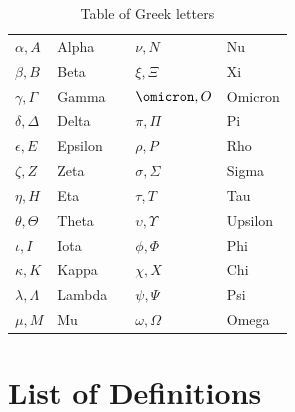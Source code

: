 \documentclass[openany,leqno,11pt,draft]{book}
\theoremstyle{break}
\theoremstyle{definition}
\theoremstyle{remark}
\begin{document}
\begin{table}[h] \begin{center}
	\begin{tabular}{llcll}
		\toprule
		$\alpha, A$ & Alpha && $\nu, N$ & Nu\\
		$\beta, B$ & Beta && $\xi, \Xi$ & Xi\\
		$\gamma, \Gamma$ & Gamma && $\omicron, O$ & Omicron\\
		$\delta, \Delta$ & Delta && $\pi, \Pi$ & Pi\\
		$\epsilon, E$ & Epsilon && $\rho, P$& Rho\\
		$\zeta, Z$ & Zeta && $\sigma, \Sigma$ & Sigma\\
		$\eta, H$ & Eta && $\tau, T$ & Tau\\
		$\theta, \Theta$ & Theta && $\upsilon, \Upsilon$ & Upsilon\\
		$\iota, I$ & Iota && $\phi, \Phi$ & Phi\\
		$\kappa, K$ & Kappa && $\chi, X$ & Chi\\
		$\lambda, \Lambda$ & Lambda && $\psi, \Psi$ & Psi\\
		$\mu, M$ & Mu && $\omega, \Omega$ & Omega \\ 
    \bottomrule
	\end{tabular}
\end{center} \caption{Table of Greek letters}
\end{table}

\twocolumn
\chapter{List of Definitions}\label{defns}
{\small  {}}



\newpage
{}
\end{document}
